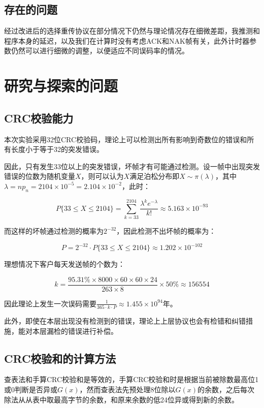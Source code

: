 \documentclass[lang=cn,11pt,a4paper,cite=authornum]{paper}
\begin{document}
\subsection{存在的问题}

经过改进后的选择重传协议在部分情况下仍然与理论情况存在细微差距，我推测和程序本身的延迟，以及我们在计算时没有考虑ACK和NAK帧有关，此外计时器参数仍然可以进行细微的调整，以便适应不同误码率的情况。

\section{研究与探索的问题}

\subsection{CRC校验能力}

本次实验采用32位CRC校验码，理论上可以检测出所有影响到奇数位的错误和所有长度小于等于32的突发错误。

因此，只有发生33位以上的突发错误，坏帧才有可能通过检测。设一帧中出现突发错误的位数为随机变量$X$，则可以认为$X$满足泊松分布即$X\sim \pi(\lambda)$，其中$\lambda = np_n = 2104\times 10^{-5} = 2.104\times 10^{-2}$，此时：

$$
    P\{33\leq X\leq 2104\} = \sum_{k=33}^{2104} \frac{\lambda^k e^{-\lambda}}{k!} \approx 5.163\times 10^{-93}
$$

而这样的坏帧通过检测的概率为$2^{-32}$，因此检测不出坏帧的概率为：

$$
    P = 2^{-32}\cdot P\{33\leq X\leq 2104\}\approx 1.202\times 10^{-102}
$$

理想情况下客户每天发送帧的个数为：

$$
    k = \frac{95.31\%\times 8000\times 60\times 60\times 24}{263\times 8}\times 50\% \approx 156554
$$

因此理论上发生一次误码需要$\frac 1{365\cdot k\cdot P}\approx 1.455\times 10^{94}$年。

此外，即使在本层出现没有检测到的错误，理论上上层协议也会有检错和纠错措施，能对本层漏检的错误进行补偿。

\subsection{CRC校验和的计算方法}

查表法和手算CRC校验和是等效的，手算CRC校验和时是根据当前被除数最高位1或0判断是否异或$G(x)$，然而查表法先预处理8位除以$G(x)$的余数，之后每次除法从从表中取最高字节的余数，和原来余数的低24位异或得到新的余数。
\end{document}
